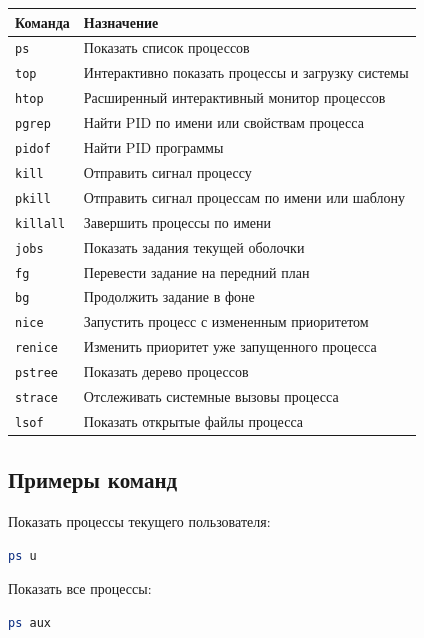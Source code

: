 \documentclass[12pt,a4paper]{article}
\begin{document}
\begin{longtable}{|p{4cm}|p{9cm}|}
\hline
\textbf{Команда} & \textbf{Назначение} \\
\hline
\texttt{ps} & Показать список процессов \\
\hline
\texttt{top} & Интерактивно показать процессы и загрузку системы \\
\hline
\texttt{htop} & Расширенный интерактивный монитор процессов \\
\hline
\texttt{pgrep} & Найти PID по имени или свойствам процесса \\
\hline
\texttt{pidof} & Найти PID программы \\
\hline
\texttt{kill} & Отправить сигнал процессу \\
\hline
\texttt{pkill} & Отправить сигнал процессам по имени или шаблону \\
\hline
\texttt{killall} & Завершить процессы по имени \\
\hline
\texttt{jobs} & Показать задания текущей оболочки \\
\hline
\texttt{fg} & Перевести задание на передний план \\
\hline
\texttt{bg} & Продолжить задание в фоне \\
\hline
\texttt{nice} & Запустить процесс с измененным приоритетом \\
\hline
\texttt{renice} & Изменить приоритет уже запущенного процесса \\
\hline
\texttt{pstree} & Показать дерево процессов \\
\hline
\texttt{strace} & Отслеживать системные вызовы процесса \\
\hline
\texttt{lsof} & Показать открытые файлы процесса \\
\hline
\end{longtable}

\subsection{Примеры команд}

Показать процессы текущего пользователя:

\begin{lstlisting}[language=bash]
ps u
\end{lstlisting}

Показать все процессы:

\begin{lstlisting}[language=bash]
ps aux
\end{lstlisting}
\end{document}
